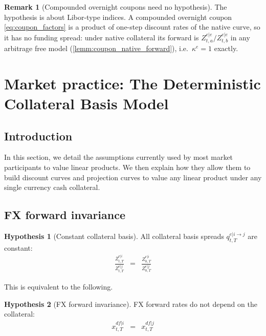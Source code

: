 \documentclass[11pt,english]{amsart}
\theoremstyle{definition}
\newtheorem{rema}{Remark}
\newtheorem*{hypo}{Hypothesis}
\begin{document}
\begin{rema}[Compounded overnight coupons need no hypothesis]\label{rema:rfr_no_funding_spread}
The hypothesis is about Libor-type indices. A compounded overnight coupon \eqref{eq:coupon_factors} is a product of one-step discount rates of the native curve, so it has no funding spread: under native collateral its forward is $Z^{e|e}_{t,a}/Z^{e|e}_{t,b}$ in any arbitrage free model (\autoref{lemm:coupon_native_forward}), i.e.\ $\kappa^e = 1$ exactly.
\end{rema}

\newpage%
\section{Market practice: The Deterministic Collateral Basis Model}%

\setcounter{subsection}{-1}
\subsection{Introduction}%
In this section, we detail the assumptions currently used by most market participants to value linear products. 
We then explain how they allow them to build discount curves and projection curves to value any linear product under any single currency cash collateral. 



\subsection{FX forward invariance}%

\begin{hypo}[Constant collateral basis]
All collateral basis spreads $q^{e|i\to j}_{t,T}$ are constant:
\begin{eqnarray}
  \frac{Z^{e|i}_{t,T}}{Z^{e|j}_{t,T}} &=& \frac{Z^{e|i}_{0,T}}{Z^{e|j}_{0,T}} 
  \label{hypo:constant_collateral_basis}
\end{eqnarray}
\end{hypo}


This is equivalent to the following.
\begin{hypo}[FX forward invariance]
FX forward rates do not depend on the collateral: 
\begin{eqnarray}
  x^{df|i}_{t,T} &=& x^{df|j}_{t,T} 
  \label{eq:fx_forward_invariance}
\end{eqnarray}
\end{hypo}
\end{document}
